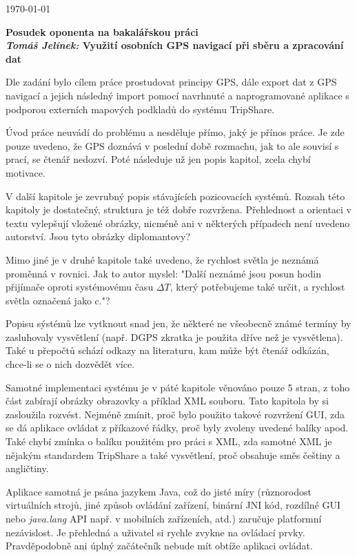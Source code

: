 \documentclass{article}
\begin{document}
\begin{flushright}
\today
\end{flushright}
\begin{center}
\Large\textbf{Posudek oponenta na bakalářskou práci \\
\normalsize%
\textit{Tomáš Jelínek:} Využití osobních GPS navigací při sběru a zpracování
dat}
\end{center}

Dle zadání bylo cílem práce prostudovat principy GPS, dále export dat z
GPS navigací a jejich následný import
pomocí navrhnuté a naprogramované aplikace s podporou externích mapových
podkladů do systému TripShare.

Úvod práce neuvádí do problému a nesděluje přímo, jaký je přínos práce. Je zde
pouze uvedeno, že GPS doznává v poslední době rozmachu, jak to ale souvisí s
prací, se čtenář nedozví. Poté následuje už jen popis kapitol, zcela chybí
motivace.

V další kapitole je zevrubný popis stávajících pozicovacích systémů. Rozsah
této kapitoly je dostatečný, struktura je též dobře rozvržena. Přehlednost a
orientaci v textu vylepšují vložené obrázky, nicméně ani v některých případech
není uvedeno autorství. Jsou tyto obrázky diplomantovy?

Mimo jiné je v druhé kapitole také uvedeno, že rychlost světla je neznámá
proměnná v
rovnici. Jak to autor myslel: "Další neznámé jsou posun hodin přijímače oproti
systémovému času $\Delta T$, který potřebujeme také určit, a rychlost světla
označená jako c."?

Popisu sýstémů lze vytknout snad jen, že některé ne
všeobecně známé termíny by zasluhovaly vysvětlení (např. DGPS zkratka je
použita dříve než je vysvětlena). Také u
přepočtů schází odkazy na literaturu, kam může být čtenář odkázán, chce-li
se o nich dozvědět více.

Samotné implementaci systému je v páté kapitole věnováno pouze 5 stran,
z toho část
zabírají obrázky obrazovky a příklad XML souboru. Tato kapitola by si
zasloužila rozvést. Nejméně zmínit, proč bylo použito takové rozvržení GUI,
zda se dá aplikace ovládat z příkazové řádky, proč byly zvoleny uvedené balíky
apod. Také chybí zmínka o balíku
použitém pro práci s XML, zda samotné XML je nějakým standardem TripShare a
také vysvětlení, proč obsahuje směs češtiny a angličtiny.

Aplikace samotná je psána jazykem Java, což do jisté míry (různorodost
virtuálních strojů, jiné způsob ovládání zařízení, binární JNI kód, rozdílné
GUI nebo \textit{java.lang} API např. v mobilních zařízeních, atd.) zaručuje
platformní
nezávislost. Je přehledná a uživatel si rychle zvykne na ovládací prvky.
Pravděpodobně ani úplný začátečník nebude mít obtíže aplikaci ovládat.
\end{document}
